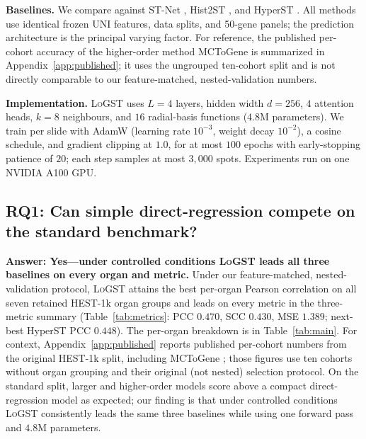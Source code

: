 \documentclass[10pt,twocolumn,letterpaper]{article}
\newcommand{\morph}{\textsc{LoGST}}
\begin{document}
\textbf{Baselines.} We compare against ST-Net \cite{he2020stnet},
Hist2ST \cite{zeng2022hist2st},
and HyperST \cite{zhang2026hyperst}. All
methods use identical frozen UNI features, data splits, and 50-gene panels; the prediction architecture
is the principal varying factor. For reference, the published per-cohort accuracy of the
higher-order method MCToGene \cite{sun2026mctogene} is summarized in
Appendix~\ref{app:published}; it uses the ungrouped ten-cohort split and is not directly comparable
to our feature-matched, nested-validation numbers.

\textbf{Implementation.} \morph{} uses $L{=}4$ layers, hidden width $d{=}256$, $4$ attention heads,
$k{=}8$ neighbours, and $16$ radial-basis functions ($4.8$M parameters). We train per slide with AdamW
(learning rate $10^{-3}$, weight decay $10^{-2}$), a cosine schedule, and gradient clipping at $1.0$,
for at most $100$ epochs with early-stopping patience of $20$; each step samples at most $3{,}000$
spots. Experiments run on one NVIDIA A100 GPU.

\subsection{RQ1: Can simple direct-regression compete on the standard benchmark?}
\label{sec:rq1}
\noindent\textbf{Answer: Yes---under controlled conditions \morph{} leads all three baselines on every organ and metric.}
Under our feature-matched, nested-validation protocol, \morph{} attains the best per-organ Pearson
correlation on all seven retained HEST-1k organ groups and leads on every metric in the three-metric summary
(Table~\ref{tab:metrics}: PCC $0.470$, SCC $0.430$, MSE $1.389$; next-best HyperST PCC $0.448$).
The per-organ breakdown is in Table~\ref{tab:main}.
For context, Appendix~\ref{app:published} reports published per-cohort numbers from the original
HEST-1k split, including MCToGene \cite{sun2026mctogene}; those figures use ten cohorts without
organ grouping and their original (not nested) selection protocol.
On the standard split, larger and higher-order models score above a compact direct-regression model
as expected; our finding is that under controlled conditions \morph{} consistently leads the same
three baselines while using one forward pass and $4.8$M parameters.
\end{document}
